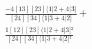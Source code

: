 \documentclass[varwidth, border=5pt]{standalone}
\begin{document}
\begin{my}
$\begin{gathered}
\scriptscriptstyle\frac{-4[13][23]⟨1|2+4|3]}{[24][34]⟨1|3+4|2]} +\\
\scriptscriptstyle\frac{1[12][23]⟨1|2+4|3]²}{[24][34]⟨1|3+4|2]²} \phantom{+}
\end{gathered}$
\end{my}
\end{document}
